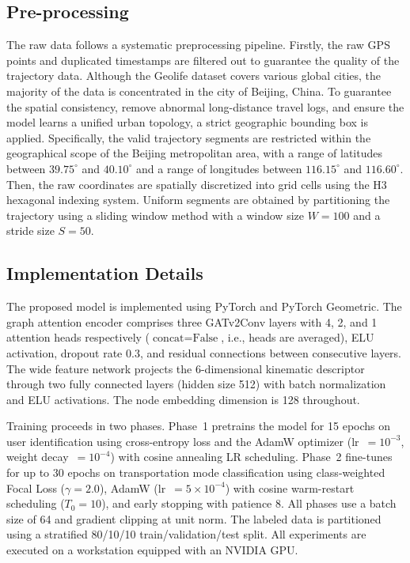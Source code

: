 \documentclass[conference]{IEEEtran}
\begin{document}
\subsection{Pre-processing}
The raw data follows a systematic preprocessing pipeline. Firstly, the raw GPS points and duplicated timestamps are filtered out to guarantee the quality of the trajectory data. Although the Geolife dataset covers various global cities, the majority of the data is concentrated in the city of Beijing, China. To guarantee the spatial consistency, remove abnormal long-distance travel logs, and ensure the model learns a unified urban topology, a strict geographic bounding box is applied. Specifically, the valid trajectory segments are restricted within the geographical scope of the Beijing metropolitan area, with a range of latitudes between $39.75^{\circ}$ and $40.10^{\circ}$ and a range of longitudes between $116.15^{\circ}$ and $116.60^{\circ}$. Then, the raw coordinates are spatially discretized into grid cells using the H3 hexagonal indexing system. Uniform segments are obtained by partitioning the trajectory using a sliding window method with a window size $W=100$ and a stride size $S=50$.

\subsection{Implementation Details}
The proposed model is implemented using PyTorch and PyTorch Geometric. The graph attention encoder comprises three GATv2Conv layers with 4, 2, and 1 attention heads respectively ($\text{concat}=\text{False}$, i.e., heads are averaged), ELU activation, dropout rate 0.3, and residual connections between consecutive layers. The wide feature network projects the 6-dimensional kinematic descriptor through two fully connected layers (hidden size 512) with batch normalization and ELU activations. The node embedding dimension is 128 throughout.

Training proceeds in two phases. Phase~1 pretrains the model for 15 epochs on user identification using cross-entropy loss and the AdamW optimizer (lr~$= 10^{-3}$, weight decay~$= 10^{-4}$) with cosine annealing LR scheduling. Phase~2 fine-tunes for up to 30 epochs on transportation mode classification using class-weighted Focal Loss ($\gamma = 2.0$), AdamW (lr~$= 5 \times 10^{-4}$) with cosine warm-restart scheduling ($T_0 = 10$), and early stopping with patience 8. All phases use a batch size of 64 and gradient clipping at unit norm. The labeled data is partitioned using a stratified 80/10/10 train/validation/test split. All experiments are executed on a workstation equipped with an NVIDIA GPU.
\end{document}
